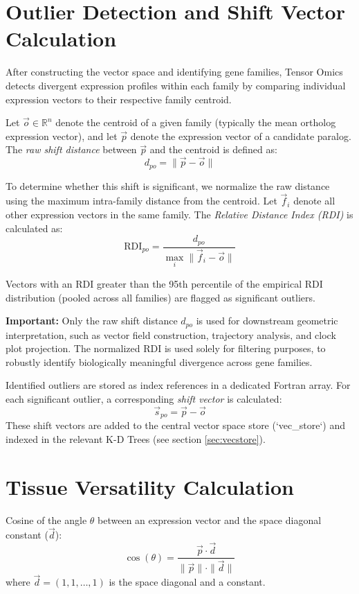 \documentclass{article}
\begin{document}
\section{Outlier Detection and Shift Vector Calculation}
\label{sec:outlier_detection}

After constructing the vector space and identifying gene families, Tensor Omics detects divergent expression profiles within each family by comparing individual expression vectors to their respective family centroid.

Let \( \vec{o} \in \mathbb{R}^n \) denote the centroid of a given family (typically the mean ortholog expression vector), and let \( \vec{p} \) denote the expression vector of a candidate paralog. The \emph{raw shift distance} between \( \vec{p} \) and the centroid is defined as:
\[
d_{po} = \| \vec{p} - \vec{o} \|
\]

To determine whether this shift is significant, we normalize the raw distance using the maximum intra-family distance from the centroid. Let \( \vec{f}_i \) denote all other expression vectors in the same family. The \emph{Relative Distance Index (RDI)} is calculated as:
\[
\text{RDI}_{po} = \frac{d_{po}}{\max_i \| \vec{f}_i - \vec{o} \|}
\]

Vectors with an RDI greater than the 95th percentile of the empirical RDI distribution (pooled across all families) are flagged as significant outliers.

\textbf{Important:} Only the raw shift distance \( d_{po} \) is used for downstream geometric interpretation, such as vector field construction, trajectory analysis, and clock plot projection. The normalized RDI is used solely for filtering purposes, to robustly identify biologically meaningful divergence across gene families.

Identified outliers are stored as index references in a dedicated Fortran array. For each significant outlier, a corresponding \emph{shift vector} is calculated:
\[
\vec{s}_{po} = \vec{p} - \vec{o}
\]
These shift vectors are added to the central vector space store (`vec\_store`)
and indexed in the relevant K-D Trees (see section \ref{sec:vecstore}).

\section{Tissue Versatility Calculation}
Cosine of the angle $\theta$ between an expression vector and the space
diagonal constant ($\vec{d}$):
\[
    \cos(\theta) = \frac{\vec{p} \cdot \vec{d}}{\|\vec{p}\| \cdot \|\vec{d}\|}
\]
where \( \vec{d} = (1, 1, \dots, 1) \) is the space diagonal and a constant.
\end{document}
